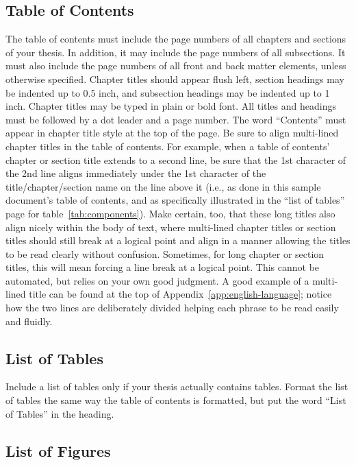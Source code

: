 \subsection{Table of Contents}

The table of contents must include the page numbers of all chapters and
sections of your thesis.  In addition, it may include the page numbers of all
subsections.  It must also include the page numbers of all front and back
matter elements, unless otherwise specified.  Chapter titles should appear
flush left, section headings may be indented up to 0.5 inch, and subsection
headings may be indented up to 1 inch.  Chapter titles may be typed in plain or
bold font.  All titles and headings must be followed by a dot leader and a page
number.  The word ``Contents'' must appear in chapter title style at the top of
the page.  Be sure to align multi-lined chapter titles in the table of
contents.  For example, when a table of contents' chapter or section title
extends to a second line, be sure that the 1st character of the 2nd line aligns
immediately under the 1st character of the title/chapter/section name on the
line above it (i.e., as done in this sample document's table of contents, and
as specifically illustrated in the ``list of tables'' page for
table~\ref{tab:components}).  Make certain, too, that these long titles also
align nicely within the body of text, where multi-lined chapter titles or
section titles should still break at a logical point and align in a manner
allowing the titles to be read clearly without confusion.  Sometimes, for long
chapter or section titles, this will mean forcing a line break at a logical
point.  This cannot be automated, but relies on your own good judgment.  A good
example of a multi-lined title can be found at the top of
Appendix~\ref{app:english-language}; notice how the two lines are deliberately
divided helping each phrase to be read easily and fluidly.

\subsection{List of Tables}

Include a list of tables only if your thesis actually contains tables.
Format the list of tables the same way the table of contents is
formatted, but put the word ``List of Tables'' in the heading.

\subsection{List of Figures}

